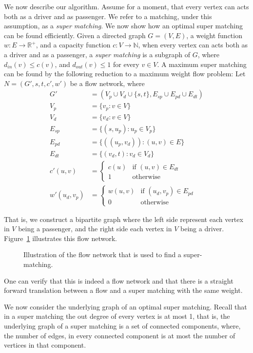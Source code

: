 We now describe our algorithm. 
Assume for a moment, 
that every vertex can acts both as a driver and as passenger.
We refer to a matching, under this assumption, as a \emph{super matching}.
We now show how an optimal super matching can be found efficiently.
Given a directed graph $G = (V, E)$,
a weight function $w : E \rightarrow \mathbb{R^+}$,
and a capacity function $c : V \rightarrow \mathbb{N}$, 
when every vertex can acts both as a driver and as a passenger, 
a \emph{super matching} is a subgraph of $G$, 
where $d_{in}(v) \leq c(v)$, and $d_{out}(v) \leq 1$ for every $v \in V$. 
A maximum super matching can be found by the following reduction 
to a maximum weight flow problem: 
Let $N = (G', s, t, c', w')$ be a flow network, where 
\begin{align*}
G'				& = (V_p \cup V_d \cup \{s, t\}, E_{sp} \cup E_{pd} \cup E_{dt})	\\
V_p				& = \{v_p : v \in V\} \\
V_d				& = \{v_d : v \in V\} \\
E_{sp}			& = \{ (s, u_p) : u_p \in V_p \} \\
E_{pd}			& = \{ ((u_p, v_d)) : (u, v) \in E \} \\
E_{dt}			& = \{ (v_d, t) : v_d \in V_d \} \\
c'(u, v)		& =
\begin{cases}
c(u) & \text{if } (u, v) \in E_{dt} \\
1 & \text{otherwise}	
\end{cases}
\\
w'(u_d, v_p)	& = 
\begin{cases}
w(u, v) & \text{if } (u_d, v_p) \in E_{pd} \\
0 & \text{otherwise}	
\end{cases}
\end{align*}

That is, 
we construct a bipartite graph where the left side represent each vertex 
in $V$ being a passenger,
and the right side each vertex in $V$ being a driver.
Figure~\ref{fig:cm-flow} illustrates this flow network.
%
\begin{figure}

\caption{
\label{fig:cm-flow}
Illustration of the flow network that is used to find a super-matching.
}
\end{figure}
%
One can verify that this is indeed a flow network and that there is a straight forward 
translation between a flow and a super matching with the same weight.

We now consider the underlying graph of an optimal super matching.
Recall that in a super matching the out degree of every vertex is at most 1,
that is, the underlying graph of a super matching is a set of connected components,
where, the number of edges, 
in every connected component is at most the number of vertices in that component.


